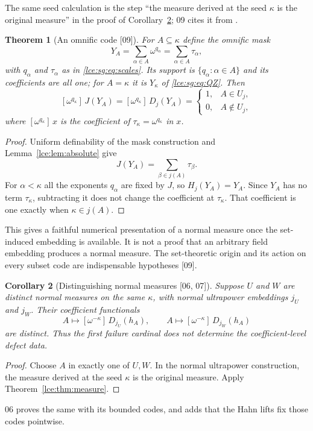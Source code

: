 \documentclass[11pt,letterpaper]{article}
\numberwithin{equation}{section}
\newtheorem{theorem}{Theorem}[section]
\newtheorem{corollary}[theorem]{Corollary}
\theoremstyle{definition}
\theoremstyle{remark}
\newcommand{\coef}[2]{[\omega^{#1}]\,#2}
\newcommand{\thref}[1]{Theorem~\ref{#1}}
\newcommand{\leref}[1]{Lemma~\ref{#1}}
\newcommand{\src}[1]{\textup{\textsf{\small[#1]}}}%
\begin{document}
The same seed calculation is the step ``the measure derived at the seed
$\kappa$ is the original measure'' in the proof of
Corollary~\ref{lce:cor:distinctU}; 09 cites it from \cite{Holland}.

\begin{theorem}[An omnific code \src{09}]\label{lce:sg:thm:measure}
For $A\subseteq\kappa$ define the omnific mask
\begin{equation}\label{lce:sg:eq:mask}
 Y_A=\sum_{\alpha\in A}\omega^{q_\alpha}=\sum_{\alpha\in A}\tau_\alpha,
\end{equation}
with $q_\alpha$ and $\tau_\alpha$ as in \eqref{lce:sg:eq:scales}. Its
support is $\{q_\alpha:\alpha\in A\}$ and its coefficients are all one; for
$A=\kappa$ it is $Y_\kappa$ of \eqref{lce:sg:eq:QZ}. Then
\begin{equation}\label{lce:sg:eq:measure}
 \coef{q_\kappa}{J(Y_A)}=\coef{q_\kappa}{D_j(Y_A)}
 =\begin{cases}1,&A\in U_j,\\0,&A\notin U_j,\end{cases}
\end{equation}
where $\coef{q_\kappa}{x}$ is the coefficient of $\tau_\kappa=\omega^{q_\kappa}$
in $x$.
\end{theorem}
\begin{proof}
Uniform definability of the mask construction and
\leref{lce:lem:absolute} give
\[
 J(Y_A)=\sum_{\beta\in j(A)}\tau_\beta.
\]
For $\alpha<\kappa$ all the exponents $q_\alpha$ are fixed by $J$, so
$H_j(Y_A)=Y_A$. Since $Y_A$ has no term $\tau_\kappa$, subtracting it does not
change the coefficient at $\tau_\kappa$. That coefficient is one exactly when
$\kappa\in j(A)$.
\end{proof}
This gives a faithful numerical presentation of a normal measure once the
set-induced embedding is available. It is not a proof that an arbitrary
field embedding produces a normal measure. The set-theoretic origin and its
action on every subset code are indispensable hypotheses \src{09}.

\begin{corollary}[Distinguishing normal measures \src{06, 07}]\label{lce:cor:distinctU}
Suppose $U$ and $W$ are distinct normal measures on the same $\kappa$, with
normal ultrapower embeddings $j_U$ and $j_W$. Their coefficient functionals
\[
 A\longmapsto\coef{-\kappa}{D_{j_U}(h_A)},\qquad
 A\longmapsto\coef{-\kappa}{D_{j_W}(h_A)}
\]
are distinct. Thus the first failure cardinal does not determine the
coefficient-level defect data.
\end{corollary}
\begin{proof}
Choose $A$ in exactly one of $U,W$. In the normal ultrapower construction,
the measure derived at the seed $\kappa$ is the original measure.
Apply \thref{lce:thm:measure}.
\end{proof}
06 proves the same with its bounded codes, and adds that the Hahn lifts fix
those codes pointwise.
\end{document}
